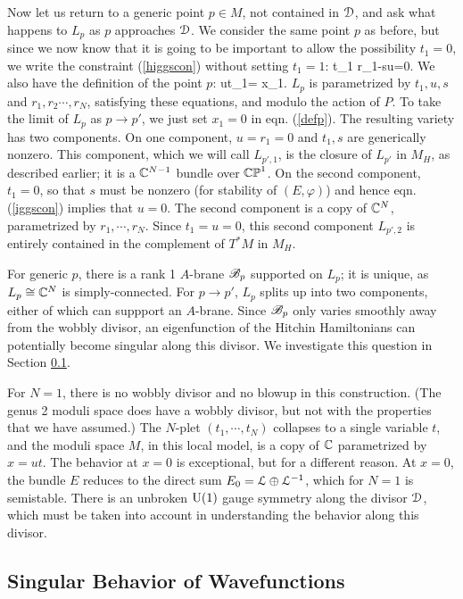 \documentclass[11pt,a4paper]{article}
\begin{document}
Now let us return to a generic point $p\in M$, not contained in ${\mathcal D}$, and ask what happens to $L_p$ as $p$ approaches ${\mathcal D}$.  We consider the same
point $p$ as before, but since we now know that it is going to be important to allow the possibility $t_1=0$, we write the constraint (\ref{higgscon}) without
setting $t_1=1$:
\be\label{iggscon} t_1 r_1-su=0. \ee
We also have the definition of the point $p$:
\be\label{defp} ut_1= x_1.\ee
$L_p $ is parametrized by  $t_1,u,s$ and $r_1,r_2\cdots, r_N$, satisfying these equations, and modulo the action of $P$. 
To take the limit of $L_p$ as $p\to p'$, we just set $x_1=0$ in eqn. (\ref{defp}).   The resulting variety has two components.  On one component, 
$u=r_1=0$ and $t_1,s$ are generically nonzero.   This component, which we will call $L_{p',1}$, is the closure of $L_{p'}$ in $M_H$, as described earlier; it is a ${\mathbb C}^{N-1}$ bundle over
${\mathbb{CP}}^1$.   On the second component, $t_1=0$, so that $s$ must be nonzero (for stability of $(E,\varphi)$) and hence eqn.
(\ref{iggscon}) implies that $u=0$.    The second component is a copy of ${\mathbb C}^N$, parametrized by $r_1,\cdots, r_N$.   Since $t_1=u=0$, this second component $L_{p',2}$
is entirely contained in the complement of  $T^*M$ in $M_H$.

For generic $p$, there is a rank 1 $A$-brane ${\mathscr B}_p$ supported on $L_p$; it is unique, as $L_p \cong {\mathbb C}^N$ is simply-connected.   For $p\to p'$,
$L_p$ splits up into two components, either of which can suppport an $A$-brane.   Since ${\mathscr B}_p$ only varies smoothly away from the wobbly divisor,
an eigenfunction of the Hitchin Hamiltonians can potentially become singular along this divisor.   
We investigate this question in Section \ref{singular}.

For $N=1$, there is no wobbly divisor and no blowup in this construction. (The genus 2 moduli space does have a wobbly divisor, but not with the
properties that we have assumed.)  The $N$-plet $(t_1,\cdots, t_N)$ collapses to a single variable
$t$, and the moduli space $M$, in this local model, is a copy of ${\mathbb C}$ parametrized by $x=ut$.   The behavior at $x=0$ is exceptional, but for a different
reason.  At $x=0$, the bundle $E$ reduces to the direct sum $E_0={\mathcal L}\oplus {\mathcal L}^{-1}$, which for $N=1$ is semistable. There is an unbroken ${\mathrm U}(1)$ gauge symmetry along the divisor ${\mathcal D}$, which must be taken into account in understanding the behavior along
this divisor. 

\subsection{Singular Behavior of Wavefunctions}\label{singular}
\end{document}
